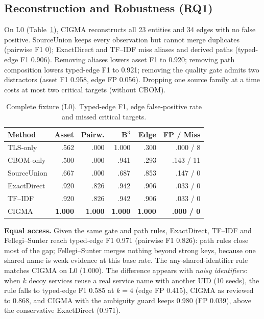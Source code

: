 \documentclass[a4paper,twoside]{article}
\newcommand{\cigma}{CIGMA\xspace}
\begin{document}
\subsection{Reconstruction and Robustness (RQ1)}
On L0 (Table~\ref{tab:recon}), \cigma reconstructs all 23 entities and 34 edges with no false positive. SourceUnion keeps every observation but cannot merge duplicates (pairwise F1 0); ExactDirect and TF--IDF miss aliases and derived paths (typed-edge F1 0.906). Removing aliases lowers asset F1 to 0.920; removing path composition lowers typed-edge F1 to 0.921; removing the quality gate admits two distractors (asset F1 0.958, edge FP 0.056). Dropping one source family at a time costs at most two critical targets (without CBOM).

\begin{table}[t]
\caption{Complete fixture (L0). Typed-edge F1, edge false-positive rate and missed critical targets.}
\label{tab:recon}
\centering\small\setlength{\tabcolsep}{3pt}
\begin{tabular}{@{}lrrrrr@{}}
\toprule
Method & Asset & Pairw. & B$^3$ & Edge & FP / Miss \\
\midrule
TLS-only & .562 & .000 & 1.000 & .300 & .000 / 8 \\
CBOM-only & .500 & .000 & .941 & .293 & .143 / 11 \\
SourceUnion & .667 & .000 & .687 & .853 & .147 / 0 \\
ExactDirect & .920 & .826 & .942 & .906 & .033 / 0 \\
TF--IDF & .920 & .826 & .942 & .906 & .033 / 0 \\
\cigma & \textbf{1.000} & \textbf{1.000} & \textbf{1.000} & \textbf{1.000} & \textbf{.000 / 0} \\
\bottomrule
\end{tabular}
\end{table}

\textbf{Equal access.} Given the same gate and path rules, ExactDirect, TF--IDF and Fellegi--Sunter reach typed-edge F1 0.971 (pairwise F1 0.826): path rules close most of the gap; Fellegi--Sunter merges nothing beyond strong keys, because one shared name is weak evidence at this base rate. The any-shared-identifier rule matches \cigma on L0 (1.000). The difference appears with \emph{noisy identifiers}: when $k$ decoy services reuse a real service name with another UID (10 seeds), the rule falls to typed-edge F1 0.585 at $k{=}4$ (edge FP 0.415), \cigma as reviewed to 0.868, and \cigma with the ambiguity guard keeps 0.980 (FP 0.039), above the conservative ExactDirect (0.971).
\end{document}
